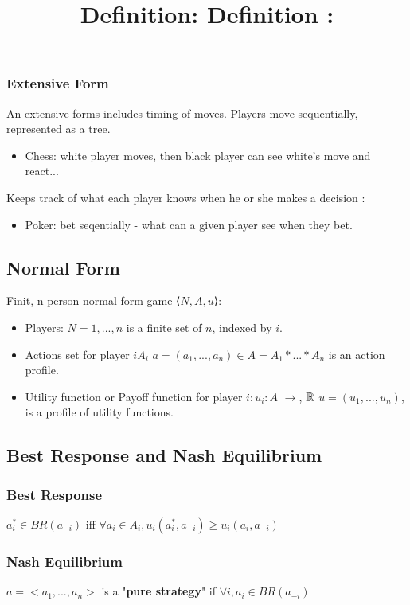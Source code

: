 \documentclass[a4paper,12pt]{article}
\begin{document}
\subsubsection{Extensive Form}
An extensive forms includes timing of moves. 
Players move sequentially, represented as a tree.
\begin{itemize}
\item Chess: white player moves, then black player can see white's move and react...
\end{itemize}
Keeps track of what each player knows when he or she makes a decision :
\begin{itemize}
\item Poker: bet seqentially - what can a given player see when they bet. 
\end{itemize}
\subsection{Normal Form}
Finit, n-person normal form game  ⟨$N, A, u$⟩:
\begin{itemize}
\item Players: $ N = {1, ... , n} $ is a finite set of $n$, indexed by $i$.
\item Actions set for player $i A_i$
\subitem $a = (a_1,...,a_n) \in A = A_1 * ... * A_n $ is an action profile.

\item Utility function or Payoff function for player $i: u_i : A $  $\to$, ${\Bbb{R}}$
\subitem $u = (u_1,..., u_n)$, is a profile of utility functions.
\end{itemize}
\subsection{Best Response and Nash Equilibrium}
\subsubsection{Best Response}
\title{\textbf{Definition:} }
$a_i^* \in BR(a_{-i}) $ iff $  \forall a_i \in A_i, u_i(a_i^*,a_{-i}) \geq u_i(a_i, a_{-i})$  
\subsubsection{Nash Equilibrium}
\title{\textbf{Definition :} }
$a = <a_1,...,a_n>$ is a "\textbf{pure strategy}" if $\forall i, a_i \in BR(a_{-i})$
\end{document}

